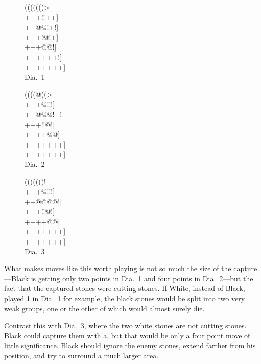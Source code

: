 \documentclass[mcrownvopaper,10pt,twopage,onecolumn,final]{memoir}
\begin{document}
\begin{figure}[ht]
    \begin{minipage}[c]{0.33\linewidth}
        \centering    
        {\gnos%
        (((((((>\\
        +++!!++]\\
        ++@@!+!]\\
        +++!@!+]\\
        ++{\gnosb{}}+@@!]\\
        ++++++!]\\
        +++++++]\\
        }
        Dia.\ 1
    \end{minipage}%
    \begin{minipage}[c]{0.33\linewidth}
        \centering    
        {\gnos%
        ((((@((>\\
        +++@!!!]\\
        ++@@@!+!\\
        +++!!@!]\\
        ++{\gnosb{}}++@@]\\
        +++++++]\\
        +++++++]\\
        }
        Dia.\ 2
    \end{minipage}%
    \begin{minipage}[c]{0.33\linewidth}
        \centering    
        {\gnos%
        (((((((!\\
        +++@!!!]\\
        ++@@@@!]\\
        +++!!@!]\\
        ++++@@]\\
        +++++++]\\
        +++++++]\\
        }
        Dia.\ 3
    \end{minipage}
\end{figure}

What makes moves like this worth playing is not so much the size of
the capture—Black is getting only two points in Dia.\ 1 and four points
in Dia.\ 2—but the fact that the captured stones were cutting stones. If
White, instead of Black, played 1 in Dia.\ 1 for example, the black stones
would be split into two very weak groups, one or the other of which
would almost surely die.

Contrast this with Dia.\ 3, where the two white stones are not cutting
stones. Black could capture them with a, but that would be only a four
point move of little significance. Black should ignore the enemy
stones, extend farther from his position, and try to surround a much
larger area.
\end{document}
